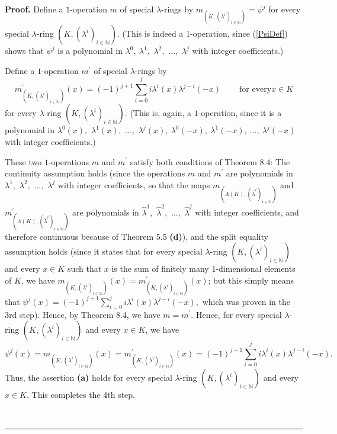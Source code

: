 \documentclass[numbers=enddot,12pt,final,onecolumn,notitlepage]{scrartcl}%
\newenvironment{proof}[1][Proof]{\noindent\textbf{#1.} }{\ \rule{0.5em}{0.5em}}
\begin{document}
\begin{proof}
Define a $1$-operation $m$ of special $\lambda$-rings by $m_{\left(  K,\left(
\lambda^{i}\right)  _{i\in\mathbb{N}}\right)  }=\psi^{j}$ for every special
$\lambda$-ring $\left(  K,\left(  \lambda^{i}\right)  _{i\in\mathbb{N}%
}\right)  $. (This is indeed a $1$-operation, since (\ref{PsiDef}) shows that
$\psi^{j}$ is a polynomial in $\lambda^{0},\ \lambda^{1},$ $\lambda^{2},$
$...,$ $\lambda^{j}$ with integer coefficients.)

Define a $1$-operation $m^{\prime}$ of special $\lambda$-rings by%
\[
m_{\left(  K,\left(  \lambda^{i}\right)  _{i\in\mathbb{N}}\right)  }^{\prime
}\left(  x\right)  =\left(  -1\right)  ^{j+1}\sum_{i=0}^{j}i\lambda^{i}\left(
x\right)  \lambda^{j-i}\left(  -x\right)  \ \ \ \ \ \ \ \ \ \ \text{for every
}x\in K
\]
for every $\lambda$-ring $\left(  K,\left(  \lambda^{i}\right)  _{i\in
\mathbb{N}}\right)  $. (This is, again, a $1$-operation, since it is a
polynomial in $\lambda^{0}\left(  x\right)  ,$ $\lambda^{1}\left(  x\right)
,$ $...,$ $\lambda^{j}\left(  x\right)  ,\ \lambda^{0}\left(  -x\right)
,\ \lambda^{1}\left(  -x\right)  ,\ \ldots,\ \lambda^{j}\left(  -x\right)  $
with integer coefficients.)

These two $1$-operations $m$ and $m^{\prime}$ satisfy both conditions of
Theorem 8.4: The continuity assumption holds (since the operations $m$ and
$m^{\prime}$ are polynomials in $\lambda^{1},$ $\lambda^{2},$ $...,$
$\lambda^{j}$ with integer coefficients, so that the maps $m_{\left(
\Lambda\left(  K\right)  ,\left(  \widehat{\lambda}^{i}\right)  _{i\in
\mathbb{N}}\right)  }$ and $m_{\left(  \Lambda\left(  K\right)  ,\left(
\widehat{\lambda}^{i}\right)  _{i\in\mathbb{N}}\right)  }^{\prime}$ are
polynomials in $\widehat{\lambda}^{1},$ $\widehat{\lambda}^{2},$ $...,$
$\widehat{\lambda}^{j}$ with integer coefficients, and therefore continuous
because of Theorem 5.5 \textbf{(d)}), and the split equality assumption holds
(since it states that for every special $\lambda$-ring $\left(  K,\left(
\lambda^{i}\right)  _{i\in\mathbb{N}}\right)  $ and every $x\in K$ such that
$x$ is the sum of finitely many $1$-dimensional elements of $K$, we have
$m_{\left(  K,\left(  \lambda^{i}\right)  _{i\in\mathbb{N}}\right)  }\left(
x\right)  =m_{\left(  K,\left(  \lambda^{i}\right)  _{i\in\mathbb{N}}\right)
}^{\prime}\left(  x\right)  $; but this simply means that $\psi^{j}\left(
x\right)  =\left(  -1\right)  ^{j+1}\sum\limits_{i=0}^{j}i\lambda^{i}\left(
x\right)  \lambda^{j-i}\left(  -x\right)  ,$ which was proven in the 3rd
step). Hence, by Theorem 8.4, we have $m=m^{\prime}$. Hence, for every special
$\lambda$-ring $\left(  K,\left(  \lambda^{i}\right)  _{i\in\mathbb{N}%
}\right)  $ and every $x\in K$, we have%
\[
\psi^{j}\left(  x\right)  =m_{\left(  K,\left(  \lambda^{i}\right)
_{i\in\mathbb{N}}\right)  }\left(  x\right)  =m_{\left(  K,\left(  \lambda
^{i}\right)  _{i\in\mathbb{N}}\right)  }^{\prime}\left(  x\right)  =\left(
-1\right)  ^{j+1}\sum_{i=0}^{j}i\lambda^{i}\left(  x\right)  \lambda
^{j-i}\left(  -x\right)  .
\]
Thus, the assertion \textbf{(a)} holds for every special $\lambda$-ring
$\left(  K,\left(  \lambda^{i}\right)  _{i\in\mathbb{N}}\right)  $ and every
$x\in K$. This completes the 4th step.


\end{proof}
\end{document}
